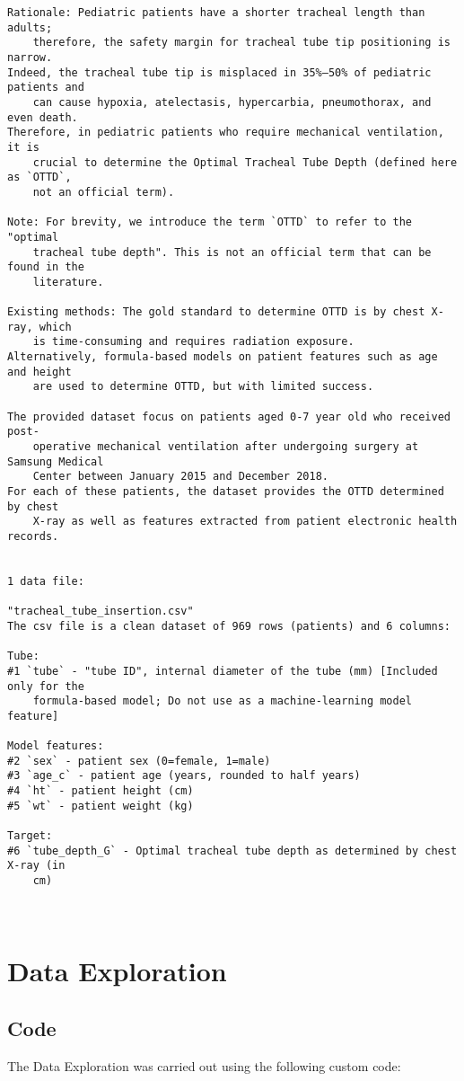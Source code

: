 \documentclass[11pt]{article}
\begin{document}
\begin{Verbatim}[tabsize=4]
Rationale: Pediatric patients have a shorter tracheal length than adults;
	therefore, the safety margin for tracheal tube tip positioning is narrow.
Indeed, the tracheal tube tip is misplaced in 35%–50% of pediatric patients and
	can cause hypoxia, atelectasis, hypercarbia, pneumothorax, and even death.
Therefore, in pediatric patients who require mechanical ventilation, it is
	crucial to determine the Optimal Tracheal Tube Depth (defined here as `OTTD`,
	not an official term).

Note: For brevity, we introduce the term `OTTD` to refer to the "optimal
	tracheal tube depth". This is not an official term that can be found in the
	literature.

Existing methods: The gold standard to determine OTTD is by chest X-ray, which
	is time-consuming and requires radiation exposure.
Alternatively, formula-based models on patient features such as age and height
	are used to determine OTTD, but with limited success.

The provided dataset focus on patients aged 0-7 year old who received post-
	operative mechanical ventilation after undergoing surgery at Samsung Medical
	Center between January 2015 and December 2018.
For each of these patients, the dataset provides the OTTD determined by chest
	X-ray as well as features extracted from patient electronic health records.


1 data file:

"tracheal_tube_insertion.csv"
The csv file is a clean dataset of 969 rows (patients) and 6 columns:

Tube:
#1 `tube` - "tube ID", internal diameter of the tube (mm) [Included only for the
	formula-based model; Do not use as a machine-learning model feature]

Model features:
#2 `sex` - patient sex (0=female, 1=male)
#3 `age_c` - patient age (years, rounded to half years)
#4 `ht` - patient height (cm)
#5 `wt` - patient weight (kg)

Target:
#6 `tube_depth_G` - Optimal tracheal tube depth as determined by chest X-ray (in
	cm)



\end{Verbatim}

\section{Data Exploration}
\subsection{{Code}}
The Data Exploration was carried out using the following custom code:
\end{document}
